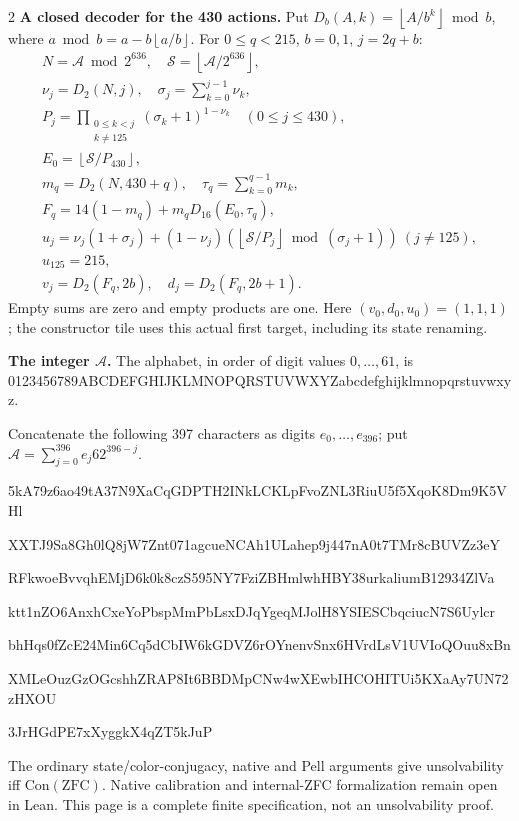 \documentclass[10pt]{article}
\newcommand{\fl}[1]{\left\lfloor#1\right\rfloor}
\begin{document}
\begin{multicols}{2}
\textbf{A closed decoder for the 430 actions.}
Put $D_b(A,k)=\fl{A/b^k}\bmod b$, where
$a\bmod b=a-b\fl{a/b}$. For $0\le q<215$, $b=0,1$, $j=2q+b$:
\[
\begin{gathered}
N=\mathcal A\bmod2^{636},\quad \mathcal S=\fl{\mathcal A/2^{636}},\\
\nu_j=D_2(N,j),\quad \sigma_j=\sum_{k=0}^{j-1}\nu_k,\\
P_j=\prod_{\substack{0\le k<j\\k\ne125}}(\sigma_k+1)^{1-\nu_k}\quad(0\le j\le430),\\
E_0=\fl{\mathcal S/P_{430}},\\
m_q=D_2(N,430+q),\quad \tau_q=\sum_{k=0}^{q-1}m_k,\\
F_q=14(1-m_q)+m_qD_{16}(E_0,\tau_q),\\
u_j=\nu_j(1+\sigma_j)+(1-\nu_j)(\fl{\mathcal S/P_j}\bmod(\sigma_j+1))\ (j\ne125),\\
u_{125}=215,\\
v_j=D_2(F_q,2b),\quad d_j=D_2(F_q,2b+1).
\end{gathered}
\]
Empty sums are zero and empty products are one. Here
$(v_0,d_0,u_0)=(1,1,1)$; the constructor tile
uses this actual first target, including its state renaming.

\textbf{The integer $\mathcal A$.}
The alphabet, in order of digit values $0,\ldots,61$, is
{\fontsize{7.7}{8.2}\selectfont\ttfamily 0123456789ABCDEFGHIJKLMNOPQRSTUVWXYZabcdefghijklmnopqrstuvwxyz}.\par
Concatenate the following 397 characters as digits $e_0,\ldots,e_{396}$;
put $\mathcal A=\sum_{j=0}^{396}e_j62^{396-j}$.\par
\begingroup\fontsize{7.7}{8.2}\selectfont\ttfamily
5kA79z6ao49tA37N9XaCqGDPTH2INkLCKLpFvoZNL3RiuU5f5XqoK8Dm9K5VHl\par
XXTJ9Sa8Gh0lQ8jW7Znt071agcueNCAh1ULahep9j447nA0t7TMr8cBUVZz3eY\par
RFkwoeBvvqhEMjD6k0k8czS595NY7FziZBHmlwhHBY38urkaliumB12934ZlVa\par
ktt1nZO6AnxhCxeYoPbspMmPbLsxDJqYgeqMJolH8YSIESCbqciucN7S6Uylcr\par
bhHqs0fZcE24Min6Cq5dCbIW6kGDVZ6rOYnenvSnx6HVrdLsV1UVIoQOuu8xBn\par
XMLeOuzGzOGcshhZRAP8It6BBDMpCNw4wXEwbIHCOHITUi5KXaAy7UN72zHXOU\par
3JrHGdPE7xXyggkX4qZT5kJuP\par
\endgroup
\normalfont\fontsize{7.7}{8.2}\selectfont
The ordinary state/color-conjugacy, native and Pell arguments give
unsolvability iff $\mathrm{Con}(\mathrm{ZFC})$.
Native calibration and internal-ZFC formalization remain open in Lean.
This page is a complete finite specification, not an unsolvability proof.
\end{multicols}
\end{document}
